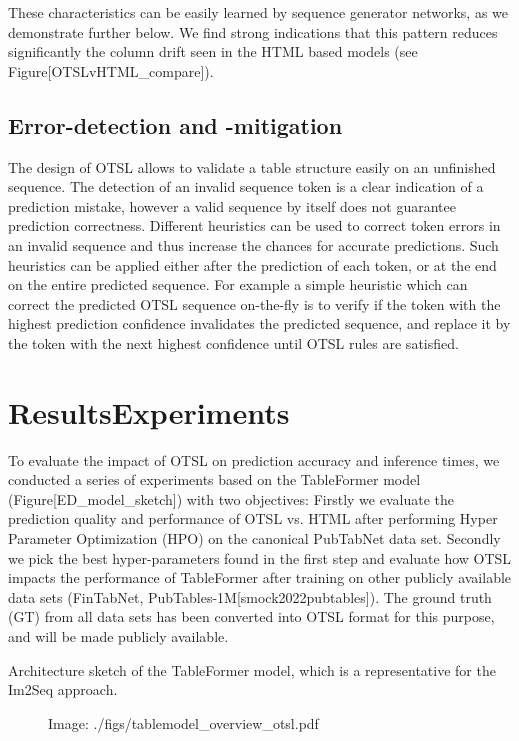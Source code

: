 \documentclass[11pt,a4paper]{article}
\begin{document}
These characteristics can be easily learned by sequence generator networks, as we demonstrate further below. We find strong indications that this pattern reduces significantly the column drift seen in the HTML based models (see Figure[OTSLvHTML\_compare]).

\subsection{Error-detection and -mitigation}

The design of OTSL allows to validate a table structure easily on an unfinished sequence. The detection of an invalid sequence token is a clear indication of a prediction mistake, however a valid sequence by itself does not guarantee prediction correctness. Different heuristics can be used to correct token errors in an invalid sequence and thus increase the chances for accurate predictions. Such heuristics can be applied either after the prediction of each token, or at the end on the entire predicted sequence.
For example a simple heuristic which can correct the predicted OTSL sequence on-the-fly is to verify if the token with the highest prediction confidence invalidates the predicted sequence, and replace it by the token with the next highest confidence until OTSL rules are satisfied.

\section{ResultsExperiments}

To evaluate the impact of OTSL on prediction accuracy and inference times, we conducted a series of experiments based on the TableFormer model (Figure[ED\_model\_sketch]) with two objectives: Firstly we evaluate the prediction quality and performance of OTSL vs. HTML after performing Hyper Parameter Optimization (HPO) on the canonical PubTabNet data set. Secondly we pick the best hyper-parameters found in the first step and evaluate how OTSL impacts the performance of TableFormer after training on other publicly available data sets (FinTabNet, PubTables-1M[smock2022pubtables]). The ground truth (GT) from all data sets has been converted into OTSL format for this purpose, and will be made publicly available.

Architecture sketch of the TableFormer model, which is a representative for the Im2Seq approach.

\begin{figure}[h]
\caption{Image: ./figs/tablemodel\_overview\_otsl.pdf}
\end{figure}
\end{document}
